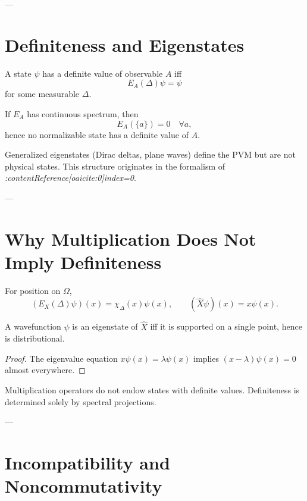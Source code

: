 \documentclass[11pt]{article}
\begin{document}
---

\section{Definiteness and Eigenstates}

\begin{definition}
A state $\psi$ has a definite value of observable $A$ iff
\[
E_A(\Delta)\psi=\psi
\]
for some measurable $\Delta$.
\end{definition}

\begin{theorem}
If $E_A$ has continuous spectrum, then
\[
E_A(\{a\})=0 \quad \forall a,
\]
hence no normalizable state has a definite value of $A$.
\end{theorem}

\begin{remark}
Generalized eigenstates (Dirac deltas, plane waves) define the PVM but are
not physical states.
This structure originates in the formalism of
\emph{:contentReference[oaicite:0]{index=0}}.
\end{remark}

---

\section{Why Multiplication Does Not Imply Definiteness}

For position on $\Omega$,
\[
(E_X(\Delta)\psi)(x)=\chi_\Delta(x)\psi(x),
\qquad
(\hat X\psi)(x)=x\psi(x).
\]

\begin{theorem}
A wavefunction $\psi$ is an eigenstate of $\hat X$ iff it is supported on a
single point, hence is distributional.
\end{theorem}

\begin{proof}
The eigenvalue equation $x\psi(x)=\lambda\psi(x)$ implies
$(x-\lambda)\psi(x)=0$ almost everywhere.
\end{proof}

\begin{corollary}
Multiplication operators do not endow states with definite values.
Definiteness is determined solely by spectral projections.
\end{corollary}

---

\section{Incompatibility and Noncommutativity}
\end{document}
